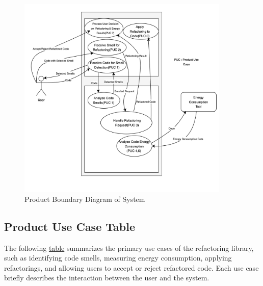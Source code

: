\documentclass[12pt]{article}
\begin{document}
\begin{figure}[H]
  \centering
  \includegraphics[width=0.9\textwidth]{../Images/use_case_diagram.png}
  \caption{Product Boundary Diagram of System}
  \label{img:prod-bound}
\end{figure}

\subsection{Product Use Case Table}
The following \hyperref[tab:puc]{table} summarizes the primary use
cases of the refactoring library, such as identifying code smells,
measuring energy consumption, applying refactorings, and allowing
users to accept or reject refactored code. Each use case briefly
describes the interaction between the user and the system.

\setlength\extrarowheight{2mm}
\end{document}
